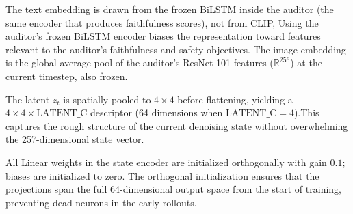 
The text embedding is drawn from the frozen BiLSTM inside the auditor
(the same encoder that produces faithfulness scores), not from CLIP, Using the auditor's frozen BiLSTM encoder biases the representation toward
features relevant to the auditor's faithfulness and safety objectives.
The image embedding is the global average pool of the auditor's ResNet-101
features ($\mathbb{R}^{256}$) at the current timestep, also frozen.

The latent $z_t$ is spatially pooled to $4 \times 4$ before flattening,
yielding a $4 \times 4 \times \mathrm{LATENT\_C}$ descriptor
(64 dimensions when $\mathrm{LATENT\_C}=4$).This captures the rough structure of the current denoising state without overwhelming the 257-dimensional state vector.

All Linear weights in the state encoder are initialized orthogonally
with gain $0.1$; biases are initialized to zero.
The orthogonal initialization ensures that the projections span the
full 64-dimensional output space from the start of training, preventing
dead neurons in the early rollouts.

